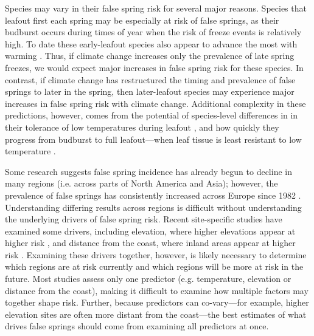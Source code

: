 \documentclass{article}\usepackage[]{graphicx}\usepackage[]{color}
\newcommand{\R}[1]{\label{#1}\linelabel{#1}}
\begin{document}
\R{Z1thresh}Species may vary in their false spring risk for several major reasons. Species that leafout first each spring may be especially at risk of false springs, as their budburst occurs during times of year when the risk of freeze events is relatively high. To date these early-leafout species also appear to advance the most with warming  \citep{Wolkovich2012}. Thus, if climate change increases only the prevalence of late spring freezes, we would expect major increases in false spring risk for these species. In contrast, if climate change has restructured the timing and prevalence of false springs to later in the spring, then later-leafout species may experience major increases in false spring risk with climate change. Additional complexity in these predictions, however, comes from the potential of species-level differences in in their tolerance of low temperatures during leafout \citep{Lenz2013}, and how quickly they progress from budburst to full leafout---when leaf tissue is least resistant to low temperature \citep{Augspurger2009,Lenz2013,Muffler2016,Zohner2020}\R{Z1threshend}.

Some research suggests false spring incidence has already begun to decline in many regions (i.e. across parts of North America and Asia); however, the prevalence of false springs has consistently increased across Europe since 1982 \citep{Liu2018}. Understanding differing results across regions is difficult without understanding the underlying drivers of false spring risk. Recent site-specific studies have examined some drivers, including elevation, where higher elevations appear at higher risk \citep{ Vitra2017,Ma2018, Vitasse2018}, and distance from the coast, where inland areas appear at higher risk \citep{Wypych2016a,Ma2018}. Examining these drivers together, however, is likely necessary to determine which regions are at risk currently and which regions will be more at risk in the future. Most studies assess only one predictor (e.g. temperature, elevation or distance from the coast), making it difficult to examine how multiple factors may together shape risk. Further, because predictors can co-vary---for example, higher elevation sites are often more distant from the coast---the best estimates of what drives false springs should come from examining all predictors at once. 
\end{document}
